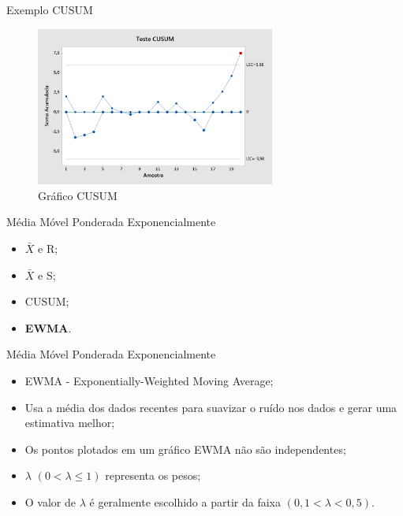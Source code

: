 \documentclass[12pt]{beamer}
\begin{document}
  \begin{frame}[t]{Exemplo CUSUM}
    \begin{figure}[ht]
      \includegraphics[width=0.7\textwidth]{img/teste_cusum}
      \caption{Gráfico CUSUM}
    \end{figure}
  \end{frame}

  \begin{frame}[t]{Média Móvel Ponderada Exponencialmente}
    \begin{itemize}
      \item $\bar X$ e R;

      \item $\bar X$ e S;

      \item CUSUM;

      \item \textbf{EWMA}.
    \end{itemize}
  \end{frame}

  \begin{frame}[t]{Média Móvel Ponderada Exponencialmente}
    \begin{itemize}
      \item EWMA - Exponentially-Weighted Moving Average;

      \item Usa a média dos dados recentes para suavizar o ruído nos dados e gerar uma estimativa melhor;

      \item Os pontos plotados em um gráfico EWMA não são independentes;

      \item $\lambda$ $(0 < \lambda \le 1)$ representa os pesos;

      \item O valor de $\lambda$ é geralmente escolhido a partir da faixa $(0,1 < \lambda < 0,5)$.
    \end{itemize}
  \end{frame}
\end{document}

